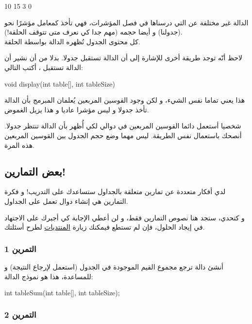 \begin{Console}
10
15
3
0
\end{Console}

الدالة غير مختلفة عن التي درسناها في فصل المؤشرات، فهي تأخذ كمعامل مؤشرًا نحو
(جدولنا) و أيضا حجمه (مهم جدا كي نعرف متى تتوقف الحلقة!).\\
كل محتوى الجدول تُظهره الدالة بواسطة الحلقة.

لاحظ أنّه توجد طريقة أخرى للإشارة إلى أن الدالة تستقبل جدولا. بدلا من أن نشير أن الدالة تستقبل
،
أكتب التالي:

\begin{Csource}
void display(int table[], int tableSize)
\end{Csource}

هذا يعني تماما نفس الشيء، و لكن وجود القوسين المربعين يُعلمان المبرمج بأن الدالة تأخذ جدولا و ليس مؤشرا عاديا و هذا يزيل الغموض.

شخصيا أستعمل دائما القوسين المربعين في دوالي لكي أُظهر بأن الدالة تنتظر جدولا. أنصحك باستعمال نفس الطريقة. ليس مهما وضع حجم الجدول بين القوسين المربعين هذه المرة.

\subsection{بعض التمارين!}

لدي أفكار متعددة عن تمارين متعلقة بالجداول ستساعدك على التدريب! و فكرة التمارين هي إنشاء دوال تعمل على الجداول.

و كتحدي، ستجد هنا نصوص  التمارين فقط، و لن أعطي الإجابة كي أجبرك على الاجتهاد في إيجاد الحلول، فإن لم تستطع فيمكنك زيارة 
\href{http://www.siteduzero.com/forum-81-126-langage-c.html}{المنتديات} 
لطرح أسئلتك.

\subsubsection{التمرين 1}

أنشئ دالة
ترجع مجموع القيم الموجودة في الجدول (استعمل
لإرجاع النتيجة) و  للمساعدة، هذا هو نموذج  الدالة:

\begin{Csource}
int tableSum(int table[], int tableSize);
\end{Csource}

\subsubsection{التمرين 2}

